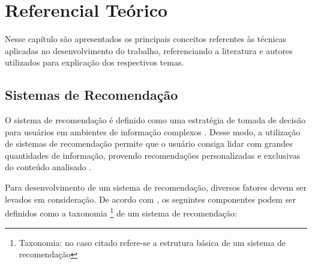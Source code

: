 
\chapter{\textbf{Referencial Teórico}}

Nesse capítulo são apresentados os principais conceitos referentes às técnicas aplicadas no desenvolvimento do trabalho, referenciando a literatura e autores utilizados para explicação dos respectivos temas.

\section{Sistemas de Recomendação}

O sistema de recomendação é definido como uma estratégia de tomada de decisão para usuários em ambientes de informação complexos \cite{rashid2002}. Desse modo, a utilização de sistemas de recomendação permite que o usuário consiga lidar com grandes quantidades de informação, provendo recomendações personalizadas e exclusivas do conteúdo analisado \cite{isinkaye2015}.

Para desenvolvimento de um sistema de recomendação, diversos fatores devem ser levados em consideração. De acordo com , os seguintes componentes podem ser definidos como a taxonomia \footnote{Taxonomia: no caso citado refere-se a estrutura básica de um sistema de recomendação} de um sistema de recomendação:

